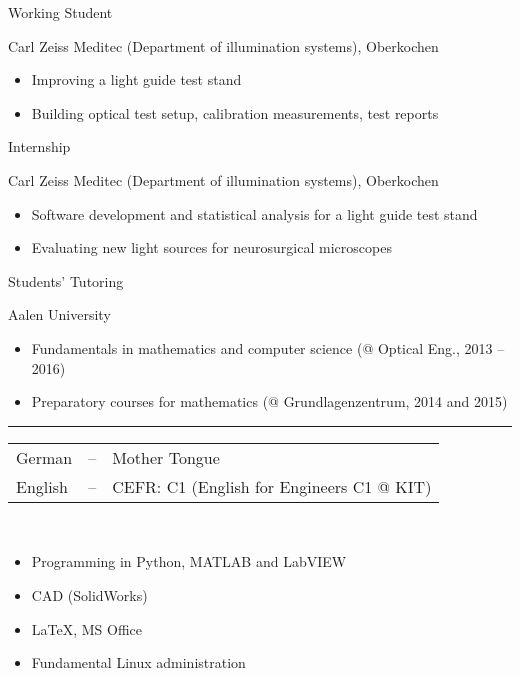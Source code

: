 \documentclass[a4paper,10pt]{article}
\newlength{\cvcolumngapwidth}
\newlength{\cvleftcolumnwidth}
\newlength{\cvrightcolumnwidth}
\newcommand{\cvsectionstyle}[1]{{\normalsize\textcolor{cvsectioncolor}{#1}}}
\newcommand{\cvtitlestyle}[1]{{\large\textcolor{cvtitlecolor}{#1}}}
\newcommand{\cvdurationstyle}[1]{{\small\textcolor{cvdurationcolor}{#1}}}
\newcommand{\cvheadingstyle}[1]{{\normalsize\textcolor{cvheadingcolor}{#1}}}
\newlength{\cvafteritemskipamount}
\newlength{\cvaftersectionskipamount}
\newlength{\cvbetweensectionandheadingextraskipamount}
\newlength{\cvaftertitleskipamount}
\newlength{\cvparskip}
\newcommand{\cvsection}[1]{
    \begin{minipage}[t][][b]{\cvleftcolumnwidth}
        \raggedleft\cvsectionstyle{#1}
    \end{minipage}%
    \hspace{\cvcolumngapwidth}%
    \begin{minipage}[t]{\cvrightcolumnwidth}
        \textcolor{cvrulecolor}{\rule{\cvrightcolumnwidth}{0.3mm}}
    \end{minipage}

    \vspace{\cvaftersectionskipamount}
}
\newcommand{\cvitem}[2]{
    \begin{minipage}[t]{\cvleftcolumnwidth}
    \strut\vspace*{-\baselineskip}\newline %
    \raggedleft #1
    \end{minipage}%
    \hspace{\cvcolumngapwidth}%
    \begin{minipage}[t]{\cvrightcolumnwidth}
        \setlength{\parskip}{\cvparskip}
        \strut\vspace*{-\baselineskip}\newline #2 %
    \end{minipage}

    \vspace{\cvafteritemskipamount}
}
\newcommand{\cvtitle}[1]{
    \cvtitlestyle{#1}

    \vspace{\cvaftertitleskipamount}
    \vspace{-\cvparskip}
}
\begin{document}
\cvitem{\cvdurationstyle{March 2015 -- July 2015}}{\cvtitle{Working Student}
    Carl Zeiss Meditec (Department of illumination systems), Oberkochen
    \begin{itemize}[leftmargin=*]
        \item Improving a light guide test stand
        \item Building optical test setup, calibration measurements, test reports
    \end{itemize}
}

\cvitem{\cvdurationstyle{September 2014 -- February 2015}}{\cvtitle{Internship}
    Carl Zeiss Meditec (Department of illumination systems), Oberkochen
    \begin{itemize}[leftmargin=*]
        \item Software development and statistical analysis for a light guide test stand
        \item Evaluating new light sources for neurosurgical microscopes 
    \end{itemize}
}

\cvitem{\cvdurationstyle{2013 -- 2016}}{\cvtitle{Students' Tutoring}
    Aalen University
    \begin{itemize}[leftmargin=*]
        \item Fundamentals in mathematics and computer science (@ Optical Eng., 2013 -- 2016)
        \item Preparatory courses for mathematics (@ Grundlagenzentrum, 2014 and 2015)
    \end{itemize}
}

\cvsection{SKILLS}

\cvitem{\cvheadingstyle{Languages}}{
    \hspace*{-2mm}\begin{tabular}{lcl}
    German  & -- & Mother Tongue \\
    English & -- & CEFR: C1 (English for Engineers C1 @  KIT) \\
    \end{tabular}
}

\cvitem{\cvheadingstyle{Computer skills}}{
    \\[-5.5ex]\begin{itemize}[leftmargin=*]
    	\item Programming in Python, MATLAB and LabVIEW
    	\item CAD (SolidWorks)
    	\item \LaTeX, MS Office
    	\item Fundamental Linux administration
    \end{itemize}
}
\end{document}
